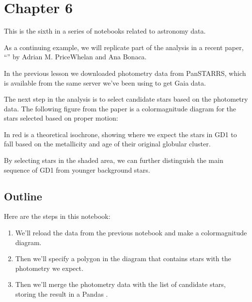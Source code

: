 \documentclass[letterpaper,10pt,english]{sphinxmanual}
\begin{document}
\chapter{Chapter 6}
\label{\detokenize{06_photo:chapter-6}}\label{\detokenize{06_photo::doc}}
This is the sixth in a series of notebooks related to astronomy data.

As a continuing example, we will replicate part of the analysis in a recent paper, “” by Adrian M. Price\sphinxhyphen{}Whelan and Ana Bonaca.

In the previous lesson we downloaded photometry data from Pan\sphinxhyphen{}STARRS, which is available from the same server we’ve been using to get Gaia data.

The next step in the analysis is to select candidate stars based on the photometry data.  The following figure from the paper is a color\sphinxhyphen{}magnitude diagram for the stars selected based on proper motion:



In red is a theoretical isochrone, showing where we expect the stars in GD\sphinxhyphen{}1 to fall based on the metallicity and age of their original globular cluster.

By selecting stars in the shaded area, we can further distinguish the main sequence of GD\sphinxhyphen{}1 from younger background stars.


\section{Outline}
\label{\detokenize{06_photo:outline}}
Here are the steps in this notebook:
\begin{enumerate}
%
\item {} 
We’ll reload the data from the previous notebook and make a color\sphinxhyphen{}magnitude diagram.

\item {} 
Then we’ll specify a polygon in the diagram that contains stars with the photometry we expect.

\item {} 
Then we’ll merge the photometry data with the list of candidate stars, storing the result in a Pandas .

\end{enumerate}
\end{document}
